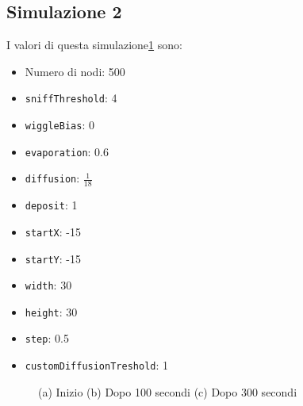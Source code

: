 \subsection{Simulazione 2}\label{sim2}
I valori di questa simulazione\space \cref{fig:sim2} sono:
\begin{itemize}
    \item Numero di nodi: 500
    \item \texttt{sniffThreshold}: 4
    \item \texttt{wiggleBias}: 0
    \item \texttt{evaporation}: 0.6
    \item \texttt{diffusion}: $\frac{1}{18}$
    \item \texttt{deposit}: 1
    \item \texttt{startX}: -15
    \item \texttt{startY}: -15
    \item \texttt{width}: 30
    \item \texttt{height}: 30
    \item \texttt{step}: 0.5
    \item \texttt{customDiffusionTreshold}: 1
\end{itemize}
\begin{figure}[p]
    \centering
    \caption{(a) Inizio (b) Dopo 100 secondi (c) Dopo 300 secondi}\label{fig:sim2}
\end{figure}

